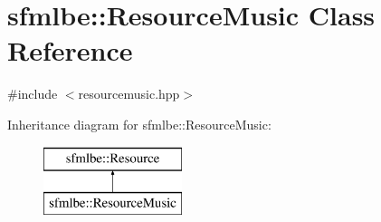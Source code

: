 \hypertarget{classsfmlbe_1_1_resource_music}{}\section{sfmlbe\+:\+:Resource\+Music Class Reference}
\label{classsfmlbe_1_1_resource_music}


{\ttfamily \#include $<$resourcemusic.\+hpp$>$}

Inheritance diagram for sfmlbe\+:\+:Resource\+Music\+:\begin{figure}[H]
\begin{center}
\leavevmode
\includegraphics[height=2.000000cm]{classsfmlbe_1_1_resource_music}
\end{center}
\end{figure}
